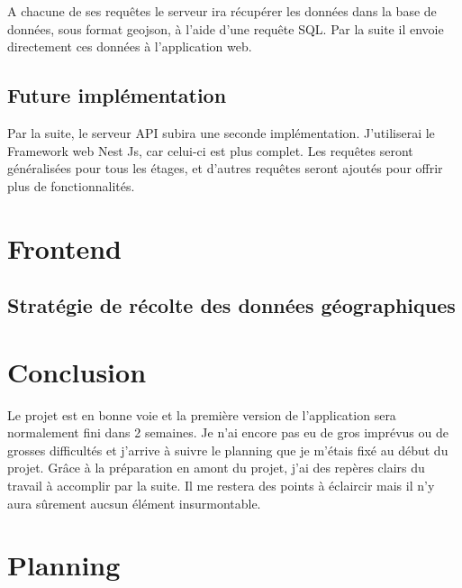 \documentclass[
    iai, %
    il, %
]{heig-tb}
\begin{document}
A chacune de ses requêtes le serveur ira récupérer les données dans la base de données,
sous format geojson, à l'aide d'une requête SQL.
Par la suite il envoie directement ces données à l'application web.

\section{Future implémentation}
Par la suite, le serveur API subira une seconde implémentation.
J'utiliserai le Framework web Nest Js, car celui-ci est plus complet.
Les requêtes seront généralisées pour tous les étages,
et d'autres requêtes seront ajoutés pour offrir plus de fonctionnalités.


\chapter{Frontend}

\section{Stratégie de récolte des données géographiques}

\chapter{Conclusion}
Le projet est en bonne voie et la première version de l'application sera normalement fini dans 2 semaines.
Je n'ai encore pas eu de gros imprévus ou de grosses difficultés et j'arrive à suivre le planning que je m'étais fixé au début du projet.
Grâce à la préparation en amont du projet, j'ai des repères clairs du travail à accomplir par la suite.
Il me restera des points à éclaircir mais il n'y aura sûrement aucsun élément insurmontable.

\vfil
\hspace{8cm}\makeatletter\@author\makeatother\par
\hspace{8cm}\begin{minipage}{5cm}
    \printsignature
\end{minipage}
\clearpage

\appendix
\appendixpage
\addappheadtotoc

\chapter{Planning}
\end{document}
